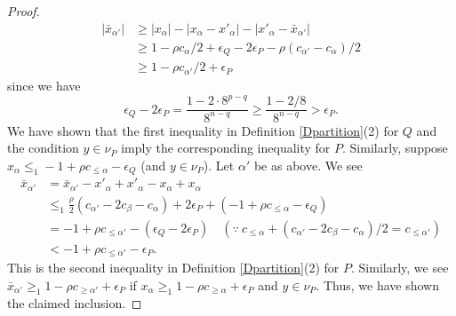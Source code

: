 \documentclass[10pt,a4paper]{amsart}
\newcommand{\eps}{\epsilon}
\begin{document}
\begin{proof}
\[
\begin{split}
|\bar x_{\alpha'}|& \geq |x_\alpha|-|x_\alpha-x'_\alpha|-|x'_\alpha-\bar x_{\alpha'}| \\
& \geq 1-\rho c_\alpha/2+\eps_Q-2\eps_P-\rho(c_{\alpha'}-c_\alpha)/2 \\
& \geq 1-\rho c_{\alpha'}/2+\eps_P
\end{split}
\]
since we have 
\[
\eps_Q-2\eps_P=\frac{1-2\cdot 8^{p-q}}{8^{n-q}}\geq \frac{1-2/8}{8^{n-q}}>\eps_P.
\]
We have shown that the first inequality in Definition \ref{Dpartition}(2) for $Q$ and the condition $y\in \nu_P$ imply the corresponding inequality for $P$. 
Similarly, suppose $x_\alpha\leq_1 -1+\rho c_{\leq \alpha}-\eps_Q$ (and $y\in \nu_P$). Let $\alpha'$ be  as above.
We see 
\[
\begin{split}
\bar x_{\alpha'} & =\bar x_{\alpha'}-x'_\alpha+x'_\alpha-x_\alpha+x_\alpha \\
& \leq_1 \frac{\rho}{2}(c_{\alpha'}-2c_\beta-c_\alpha)+2\eps_P+(-1+\rho c_{\leq \alpha}-\eps_Q) \\
&=-1+\rho c_{\leq \alpha'}-(\eps_Q-2\eps_P)  \quad (\because \ c_{\leq \alpha}+(c_{\alpha'}-2c_\beta-c_\alpha)/2=c_{\leq \alpha'}) \\
&<-1+\rho c_{\leq \alpha'}-\eps_P.
\end{split}
\]
This is  the second inequality in Definition \ref{Dpartition}(2) for $P$. 
Similarly, we see $\bar x_{\alpha'}\geq_1 1-\rho c_{\geq \alpha'}+\eps_P$ if $ x_{\alpha}\geq_1 1-\rho c_{\geq \alpha}+\eps_P$ and $y\in \nu_P$. Thus, we have shown the claimed inclusion.
\end{proof}
\end{document}
